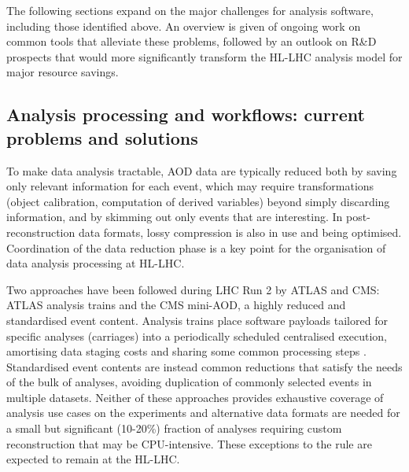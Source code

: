 \documentclass[11pt,a4paper]{article}
\begin{document}
The following sections expand on the major challenges for analysis
software, including those identified above. An overview is given of
ongoing work on common tools that alleviate these problems, followed by
an outlook on R\&D prospects that would more significantly transform the
HL-LHC analysis model for major resource savings.

\hypertarget{analysis-processing-and-workflows-current-problems-and-solutions}{%
\subsection{Analysis processing and workflows: current problems and
solutions}\label{analysis-processing-and-workflows-current-problems-and-solutions}}

To make data analysis tractable, AOD data are typically reduced both by
saving only relevant information for each event, which may require
transformations (object calibration, computation of derived variables)
beyond simply discarding information, and by skimming out only events
that are interesting. In post-reconstruction data formats, lossy
compression is also in use and being optimised. Coordination of the data
reduction phase is a key point for the organisation of data analysis
processing at HL-LHC.

Two approaches have been followed during LHC Run 2 by ATLAS and CMS:
ATLAS analysis trains \cite{Ref4} and the CMS mini-AOD, a highly reduced and
standardised event content. Analysis trains place software payloads
tailored for specific analyses (carriages) into a periodically scheduled
centralised execution, amortising data staging costs and sharing some
common processing steps \cite{Ref3}. Standardised event contents are instead
common reductions that satisfy the needs of the bulk of analyses,
avoiding duplication of commonly selected events in multiple datasets.
Neither of these approaches provides exhaustive coverage of analysis use
cases on the experiments and alternative data formats are needed for a
small but significant (10-20\%) fraction of analyses requiring custom
reconstruction that may be CPU-intensive. These exceptions to the rule
are expected to remain at the HL-LHC.
\end{document}
